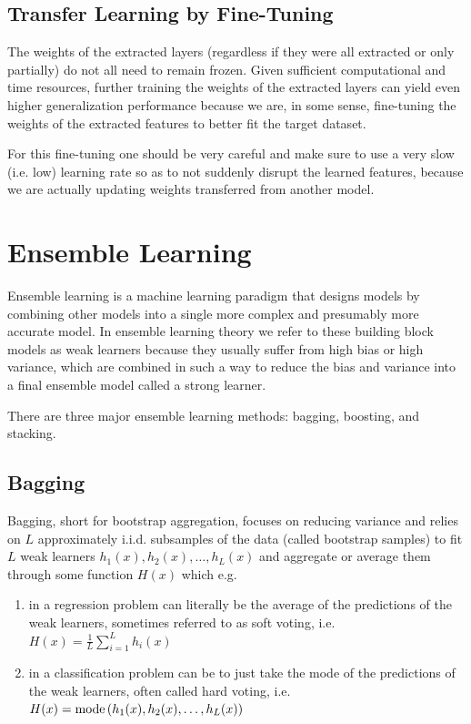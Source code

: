 \subsection{Transfer Learning by Fine-Tuning}

The weights of the extracted layers (regardless if they were all extracted or only partially) do not all need to remain frozen. Given sufficient computational and time resources, further training the weights of the extracted layers can yield even higher generalization performance because we are, in some sense, fine-tuning the weights of the extracted features to better fit the target dataset.

For this fine-tuning one should be very careful and make sure to use a very slow (i.e. low) learning rate so as to not suddenly disrupt the learned features, because we are actually updating weights transferred from another model.

\section{Ensemble Learning}

Ensemble learning is a machine learning paradigm that designs models by combining other models into a single more complex and presumably more accurate model. In ensemble learning theory we refer to these building block models as weak learners because they usually suffer from high bias or high variance, which are combined in such a way to reduce the bias and variance into a final ensemble model called a strong learner.

There are three major ensemble learning methods: bagging, boosting, and stacking.

\subsection{Bagging}

Bagging, short for bootstrap aggregation, focuses on reducing variance and relies on $L$ approximately i.i.d. subsamples of the data (called bootstrap samples) to fit $L$ weak learners $h_1(x), h_2(x), \ldots, h_L(x)$ and aggregate or average them through some function $H(x)$ which e.g.

\begin{enumerate}
    \item in a regression problem can literally be the average of the predictions of the weak learners, sometimes referred to as soft voting, i.e. $H(x) = \frac{1}{L} \sum_{i=1}^{L} h_i(x)$
    \item in a classification problem can be to just take the mode of the predictions of the weak learners, often called hard voting, i.e. $H(x) = \operatorname*{mode}{(h_1(x), h_2(x), \ldots, h_L(x))}$
\end{enumerate}

